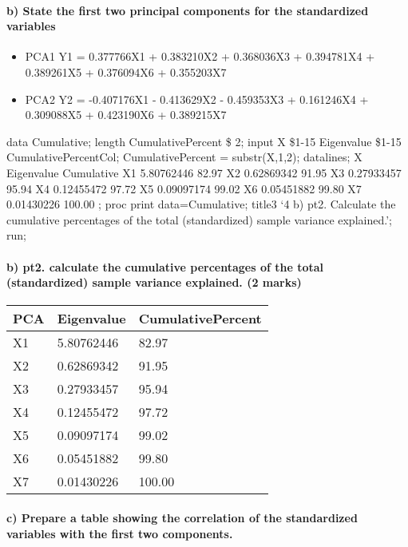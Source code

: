 \documentclass[11pt]{article}
\providecommand{\tightlist}{%
      \setlength{\itemsep}{0pt}\setlength{\parskip}{0pt}}
\begin{document}
    \hypertarget{b-state-the-first-two-principal-components-for-the-standardized-variables}{%
\paragraph{b) State the first two principal components for the
standardized
variables}\label{b-state-the-first-two-principal-components-for-the-standardized-variables}}

    \begin{itemize}
\tightlist
\item
  PCA1 Y1 = 0.377766X1 + 0.383210X2 + 0.368036X3 + 0.394781X4 +
  0.389261X5 + 0.376094X6 + 0.355203X7
\item
  PCA2 Y2 = -0.407176X1 - 0.413629X2 - 0.459353X3 + 0.161246X4 +
  0.309088X5 + 0.423190X6 + 0.389215X7
\end{itemize}

     data Cumulative; length CumulativePercent \$ 2; input X \$1-15
Eigenvalue \$1-15 CumulativePercentCol; CumulativePercent =
substr(X,1,2); datalines; X Eigenvalue Cumulative X1 5.80762446 82.97 X2
0.62869342 91.95 X3 0.27933457 95.94 X4 0.12455472 97.72 X5 0.09097174
99.02 X6 0.05451882 99.80 X7 0.01430226 100.00 ; proc print
data=Cumulative; title3 `4 b) pt2. Calculate the cumulative percentages
of the total (standardized) sample variance explained.'; run; 

    \hypertarget{b-pt2.-calculate-the-cumulative-percentages-of-the-total-standardized-sample-variance-explained.-2-marks}{%
\paragraph{b) pt2. calculate the cumulative percentages of the total
(standardized) sample variance explained. (2
marks)}\label{b-pt2.-calculate-the-cumulative-percentages-of-the-total-standardized-sample-variance-explained.-2-marks}}

    \begin{longtable}[]{@{}lll@{}}
\toprule
PCA & Eigenvalue & CumulativePercent\tabularnewline
\midrule
\endhead
X1 & 5.80762446 & 82.97\tabularnewline
X2 & 0.62869342 & 91.95\tabularnewline
X3 & 0.27933457 & 95.94\tabularnewline
X4 & 0.12455472 & 97.72\tabularnewline
X5 & 0.09097174 & 99.02\tabularnewline
X6 & 0.05451882 & 99.80\tabularnewline
X7 & 0.01430226 & 100.00\tabularnewline
\bottomrule
\end{longtable}

    \hypertarget{c-prepare-a-table-showing-the-correlation-of-the-standardized-variables-with-the-first-two-components.}{%
\paragraph{c) Prepare a table showing the correlation of the
standardized variables with the first two
components.}\label{c-prepare-a-table-showing-the-correlation-of-the-standardized-variables-with-the-first-two-components.}}
\end{document}
